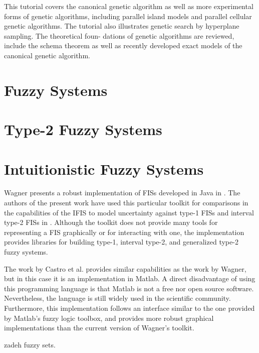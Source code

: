 \cite{Whitley1994} This tutorial covers the canonical genetic algorithm as well
as more experimental forms of genetic algorithms, including parallel island
models and parallel cellular genetic algorithms. The tutorial also illustrates
genetic search by hyperplane sampling. The theoretical foun- dations of genetic
algorithms are reviewed, include the schema theorem as well as recently
developed exact models of the canonical genetic algorithm.


\section{Fuzzy Systems}
\label{section:fuzzy-systems}

\section{Type-2 Fuzzy Systems}
\label{section:type-2-fuzzy-systems}

\section{Intuitionistic Fuzzy Systems}
\label{section:related-work-intuitionistic-fuzzy-systems}

Wagner presents a robust implementation of FISs developed in Java in
\cite{Wagner2013}. The authors of the present work have used this particular
toolkit for comparisons in the capabilities of the IFIS to model uncertainty
against type-1 FISs and interval type-2 FISs in
\cite{Hernandez-Aguila2016}. Although the toolkit does not provide many tools
for representing a FIS graphically or for interacting with one, the
implementation provides libraries for building type-1, interval type-2, and
generalized type-2 fuzzy systems.

The work by Castro et al. \cite{castro2007interval} provides similar
capabilities as the work by Wagner, but in this case it is an implementation in
Matlab. A direct disadvantage of using this programming language is that Matlab
is not a free nor open source software.  Nevertheless, the language is still
widely used in the scientific community. Furthermore, this implementation
follows an interface similar to the one provided by Matlab's fuzzy logic
toolbox, and provides more robust graphical implementations than the current
version of Wagner's toolkit.


\cite{Zadeh1965} zadeh fuzzy sets.

